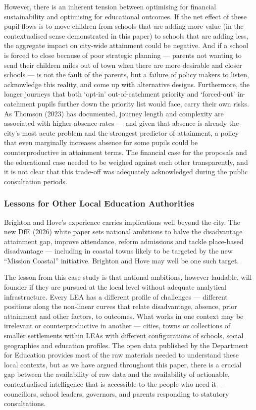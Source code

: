 \documentclass[
  11pt,
]{article}
\begin{document}
However, there is an inherent tension between optimising for financial
sustainability and optimising for educational outcomes. If the net
effect of these pupil flows is to move children from schools that are
adding more value (in the contextualised sense demonstrated in this
paper) to schools that are adding less, the aggregate impact on
city-wide attainment could be negative. And if a school is forced to
close because of poor strategic planning --- parents not wanting to send
their children miles out of town when there are more desirable and
closer schools --- is not the fault of the parents, but a failure of
policy makers to listen, acknowledge this reality, and come up with
alternative designs. Furthermore, the longer journeys that both `opt-in'
out-of-catchment priority and `forced-out' in-catchment pupils further
down the priority list would face, carry their own risks. As Thomson
(2023) has documented, journey length and complexity are associated with
higher absence rates --- and given that absence is already the city's
most acute problem and the strongest predictor of attainment, a policy
that even marginally increases absence for some pupils could be
counterproductive in attainment terms. The financial case for the
proposals and the educational case needed to be weighed against each
other transparently, and it is not clear that this trade-off was
adequately acknowledged during the public consultation periods.

\subsubsection{Lessons for Other Local Education
Authorities}\label{lessons-for-other-local-education-authorities}

Brighton and Hove's experience carries implications well beyond the
city. The new DfE (2026) white paper sets national ambitions to halve
the disadvantage attainment gap, improve attendance, reform admissions
and tackle place-based disadvantage --- including in coastal towns
likely to be targeted by the new ``Mission Coastal'' initiative.
Brighton and Hove may well be one such target.

The lesson from this case study is that national ambitions, however
laudable, will founder if they are pursued at the local level without
adequate analytical infrastructure. Every LEA has a different profile of
challenges --- different positions along the non-linear curves that
relate disadvantage, absence, prior attainment and other factors, to
outcomes. What works in one context may be irrelevant or
counterproductive in another --- cities, towns or collections of smaller
settlements within LEAs with different configurations of schools, social
geographies and education profiles. The open data published by the
Department for Education provides most of the raw materials needed to
understand these local contexts, but as we have argued throughout this
paper, there is a crucial gap between the availability of raw data and
the availability of actionable, contextualised intelligence that is
accessible to the people who need it --- councillors, school leaders,
governors, and parents responding to statutory consultations.
\end{document}
